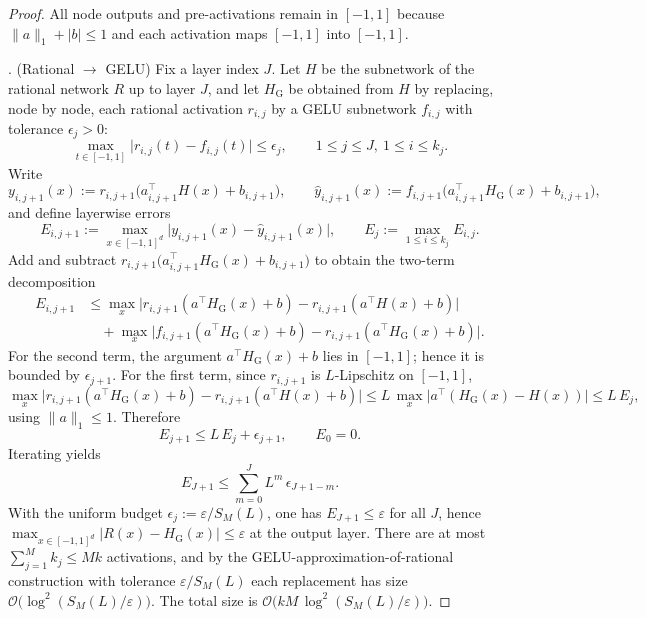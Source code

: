 \documentclass{article}
\theoremstyle{plain}
\theoremstyle{definition}
\theoremstyle{remark}
\begin{document}
\begin{proof}
All node outputs and pre-activations remain in $[-1,1]$ because $\|a\|_1+|b|\le 1$ and each activation maps $[-1,1]$ into $[-1,1]$.

. (Rational $\to$ GELU) Fix a layer index $J$. Let $H$ be the subnetwork of the rational network $R$ up to layer $J$, and let $H_{\mathrm G}$ be obtained from $H$ by replacing, node by node, each rational activation $r_{i,j}$ by a GELU subnetwork $f_{i,j}$ with tolerance $\epsilon_j>0$:
\[
\max_{t\in[-1,1]}\bigl|r_{i,j}(t)-f_{i,j}(t)\bigr|\le \epsilon_j,\qquad 1\le j\le J,\ 1\le i\le k_j .
\]
Write
\[
y_{i,j+1}(x):=r_{i,j+1}\bigl(a_{i,j+1}^\top H(x)+b_{i,j+1}\bigr),\qquad
\widehat y_{i,j+1}(x):=f_{i,j+1}\bigl(a_{i,j+1}^\top H_{\mathrm G}(x)+b_{i,j+1}\bigr),
\]
and define layerwise errors
\[
E_{i,j+1}:=\max_{x\in[-1,1]^d}\bigl|y_{i,j+1}(x)-\widehat y_{i,j+1}(x)\bigr|,
\qquad
E_j:=\max_{1\le i\le k_j}E_{i,j}.
\]
Add and subtract $r_{i,j+1}\bigl(a_{i,j+1}^\top H_{\mathrm G}(x)+b_{i,j+1}\bigr)$ to obtain the two-term decomposition
\begin{align*}
E_{i,j+1}
&\le \max_{x}\bigl|r_{i,j+1}(a^\top H_{\mathrm G}(x)+b)-r_{i,j+1}(a^\top H(x)+b)\bigr| \\
&\quad + \max_{x}\bigl|f_{i,j+1}(a^\top H_{\mathrm G}(x)+b)-r_{i,j+1}(a^\top H_{\mathrm G}(x)+b)\bigr| .
\end{align*}
For the second term, the argument $a^\top H_{\mathrm G}(x)+b$ lies in $[-1,1]$; hence it is bounded by $\epsilon_{j+1}$. For the first term, since $r_{i,j+1}$ is $L$-Lipschitz on $[-1,1]$,
\[
\max_{x}\bigl|r_{i,j+1}(a^\top H_{\mathrm G}(x)+b)-r_{i,j+1}(a^\top H(x)+b)\bigr|
\le L\,\max_{x}\bigl|a^\top(H_{\mathrm G}(x)-H(x))\bigr|
\le L\,E_j,
\]
using $\|a\|_1\le 1$. Therefore
\[
E_{j+1}\le L\,E_j+\epsilon_{j+1},\qquad E_0=0.
\]
Iterating yields
\[
E_{J+1}\le \sum_{m=0}^{J} L^{m}\,\epsilon_{J+1-m}.
\]
With the uniform budget $\epsilon_j:=\varepsilon/S_M(L)$, one has $E_{J+1}\le \varepsilon$ for all $J$, hence $\max_{x\in[-1,1]^d}|R(x)-H_{\mathrm G}(x)|\le \varepsilon$ at the output layer. There are at most $\sum_{j=1}^{M}k_j\le Mk$ activations, and by the GELU-approximation-of-rational construction with tolerance $\varepsilon/S_M(L)$ each replacement has size $\mathcal{O}\bigl(\log^2(S_M(L)/\varepsilon)\bigr)$. The total size is $\mathcal{O}\bigl(kM\,\log^2(S_M(L)/\varepsilon)\bigr)$.


\end{proof}
\end{document}

